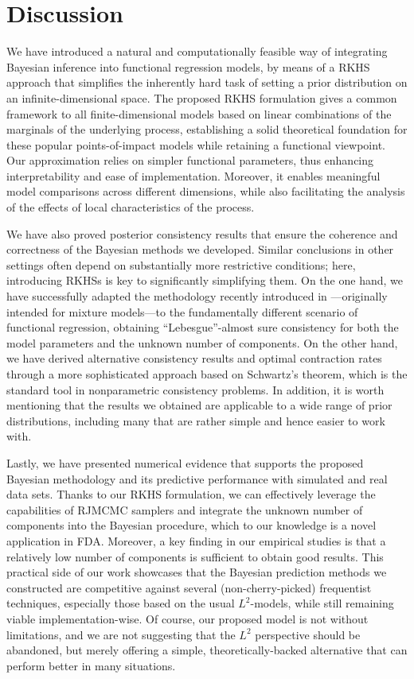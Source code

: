 \FloatBarrier{}
\section{Discussion}\label{sec:fr-discussion}

We have introduced a natural and computationally feasible way of integrating Bayesian inference into functional regression models, by means of a \acs{RKHS} approach that simplifies the inherently hard task of setting a prior distribution on an infinite-dimensional space. The proposed \acs{RKHS} formulation gives a common framework to all finite-dimensional models based on linear combinations of the marginals of the underlying process, establishing a solid theoretical foundation for these popular points-of-impact models while retaining a functional viewpoint. Our approximation relies on simpler functional parameters, thus enhancing interpretability and ease of implementation. Moreover, it enables meaningful model comparisons across different dimensions, while also facilitating the analysis of the effects of local characteristics of the process.

We have also proved posterior consistency results that ensure the coherence and correctness of the Bayesian methods we developed. Similar conclusions in other settings often depend on substantially more restrictive conditions; here, introducing \acs{RKHSs} is key to significantly simplifying them. On the one hand, we have successfully adapted the methodology recently introduced in \citet{miller2023consistency}---originally intended for mixture models---to the fundamentally different scenario of functional regression, obtaining ``Lebesgue''-almost sure consistency for both the model parameters and the unknown number of components. On the other hand, we have derived alternative consistency results and optimal contraction rates through a more sophisticated approach based on Schwartz's theorem, which is the standard tool in nonparametric consistency problems. In addition, it is worth mentioning that the results we obtained are applicable to a wide range of prior distributions, including many that are rather simple and hence easier to work with.

Lastly, we have presented numerical evidence that supports the proposed Bayesian methodology and its predictive performance with simulated and real data sets. Thanks to our \acs{RKHS} formulation, we can effectively leverage the capabilities of \acs{RJMCMC} samplers and integrate the unknown number of components into the Bayesian procedure, which to our knowledge is a novel application in \acs{FDA}. Moreover, a key finding in our empirical studies is that a relatively low number of components is sufficient to obtain good results. This practical side of our work showcases that the Bayesian prediction methods we constructed are competitive against several (non-cherry-picked) frequentist techniques, especially those based on the usual \(L^2\)-models, while still remaining viable implementation-wise. Of course, our proposed model is not without limitations, and we are not suggesting that the \(L^2\) perspective should be abandoned, but merely offering a simple, theoretically-backed alternative that can perform better in many situations.

